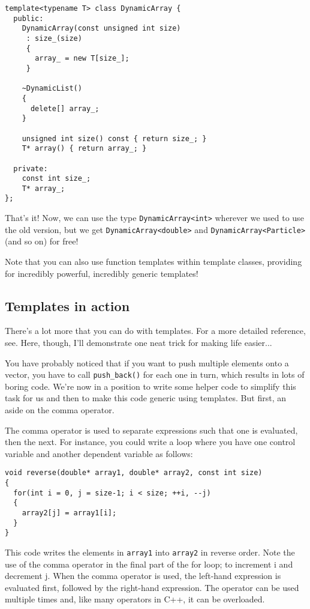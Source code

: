 \documentclass[a4paper]{scrartcl}
\begin{document}
\begin{verbatim}
template<typename T> class DynamicArray {
  public:
    DynamicArray(const unsigned int size)
     : size_(size)
     {
       array_ = new T[size_];
     }

    ~DynamicList()
    {
      delete[] array_;
    }
    
	unsigned int size() const { return size_; }
    T* array() { return array_; }

  private:
    const int size_;
    T* array_;
};
\end{verbatim}

That's it! Now, we can use the type \verb|DynamicArray<int>| wherever we used to use the old version, but we get \verb|DynamicArray<double>| and \verb|DynamicArray<Particle>| (and so on) for free! 

Note that you can also use function templates within template classes, providing for incredibly powerful, incredibly generic templates!

\subsection{Templates in action}
There's a lot more that you can do with templates. For a more detailed reference, see\cite{Templates}. Here, though, I'll demonstrate one neat trick for making life easier...

You have probably noticed that if you want to push multiple elements onto a vector, you have to call \verb|push_back()| for each one in turn, which results in lots of boring code. We're now in a position to write some helper code to simplify this task for us and then to make this code generic using templates. But first, an aside on the comma operator.

The comma operator is used to separate expressions such that one is evaluated, then the next. For instance, you could write a loop where you have one control variable and another dependent variable as follows:

\begin{verbatim}
void reverse(double* array1, double* array2, const int size)
{
  for(int i = 0, j = size-1; i < size; ++i, --j)
  {
    array2[j] = array1[i];
  }
}
\end{verbatim}

This code writes the elements in \verb|array1| into \verb|array2| in reverse order. Note the use of the comma operator in the final part of the for loop; to increment i and decrement j. When the comma operator is used, the left-hand expression is evaluated first, followed by the right-hand expression. The operator can be used multiple times and, like many operators in C++, it can be overloaded.
\end{document}
